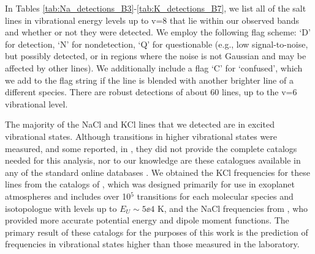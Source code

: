 \documentclass[twocolumn]{aastex62}
\newcommand{\rlp}[1]{\textcolor{red!65!black}{\textbf{[RLP: #1]}}}
\newcommand{\ag}[1]{\textcolor{red!65!black}{\textbf{[AG: #1]}}}
\begin{document}
In Tables \ref{tab:Na_detections_B3}-\ref{tab:K_detections_B7}, we list all
of the salt lines in vibrational energy levels up to v=8 that lie within our
observed bands and whether or not they were detected.  We employ the following
flag scheme: `D' for detection, `N' for nondetection, `Q' for questionable
(e.g., low signal-to-noise, but possibly detected, or in regions where the
noise is not Gaussian and may be affected by other lines).  We additionally
include a flag `C' for `confused', which we add to the flag string if the line
is blended with another brighter line of a different species.  There are robust
detections of about 60 lines, up to the v=6 vibrational level.

The majority of the NaCl and KCl lines that we detected are in excited
vibrational states.  Although transitions in higher vibrational states were
measured, and some reported, in \citet{Caris2004a}, they did not provide the
complete catalogs needed for this analysis, nor to our knowledge are these
catalogues available in any of the standard online databases \citep[i.e., CDMS,
SLAIM, JPL;][]{Muller2005a,Lovas2005b,Pickett1998a}.  We obtained the KCl
frequencies for these lines from the catalogs of \citet{Barton2014a}, which was
designed primarily for use in exoplanet atmospheres and includes over 10$^5$
transitions for each molecular species and isotopologue with levels up to
$E_U\sim5\ee{4}$ K, and the NaCl frequencies from \citet{Cabezas2016a}, who
provided more accurate potential energy and dipole moment functions. The
primary result of these catalogs for the purposes of this work is the
prediction of frequencies in vibrational states higher than those measured in
the laboratory. 


\end{document}
